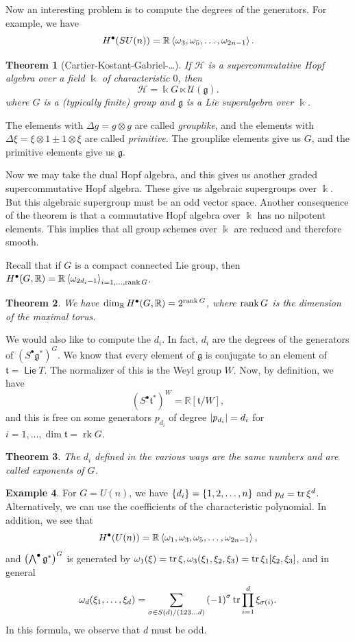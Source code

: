 \documentclass[leqno, openany]{memoir}
\newtheorem{thm}{Theorem}[section]
\theoremstyle{definition}
\newtheorem{exm}[thm]{Example}
\theoremstyle{remark}
\theoremstyle{plain}
\theoremstyle{definition}
\theoremstyle{remark}
\newcommand{\R}{\mathbb{R}}
\renewcommand{\k}{\Bbbk}
\newcommand{\mf}[1]{\mathfrak{#1}}
\DeclareMathOperator{\Lie}{\mathsf{Lie}}
\DeclareMathOperator{\rk}{rk}
\begin{document}
Now an interesting problem is to compute the degrees of the generators. For example, we have 
\[ H^{\bullet}(SU(n)) = \R \ev{\omega_3, \omega_5, \ldots, \omega_{2n-1}}. \]

\begin{thm}[Cartier-Kostant-Gabriel-\ldots]
    If $\mathcal{H}$ is a supercommutative Hopf algebra over a field $\k$ of characteristic $0$, then
    \[ \mathcal{H} = \k G \ltimes \mathcal{U}(\mf{g}). \]
    where $G$ is a (typically finite) group and $\mf{g}$ is a Lie superalgebra over $\k$.
\end{thm}

The elements with $\Delta g = g \otimes g$ are called \textit{grouplike}, and the elements with $\Delta \xi = \xi \otimes 1 \pm 1 \otimes \xi$ are called \textit{primitive}. The grouplike elements give us $G$, and the primitive elements give us $\mf{g}$. 

Now we may take the dual Hopf algebra, and this gives us another graded supercommutative Hopf algebra. These give us algebraic supergroups over $\k$. But this algebraic supergroup must be an odd vector space. Another consequence of the theorem is that a commutative Hopf algebra over $\k$ has no nilpotent elements. This implies that all group schemes over $\k$ are reduced and therefore smooth.

Recall that if $G$ is a compact connected Lie group, then $H^{\bullet}(G, \R) = \R \ev{\omega_{2d_i - 1}}_{i = 1, \ldots, \rank G}$.

\begin{thm}
    We have $\dim_{\R} H^{\bullet}(G, \R) = 2^{\rank G}$, where $\rank G$ is the dimension of the maximal torus.
\end{thm}

We would also like to compute the $d_i$. In fact, $d_i$ are the degrees of the generators of ${ ( S^{\bullet} \mf{g}^* ) }^G$. We know that every element of $\mf{g}$ is conjugate to an element of $\mf{t} = \Lie T$. The normalizer of this is the Weyl group $W$. Now, by definition, we have
\[ {(S^{\bullet} \mf{t}^*)}^W = \R[\mf{t}/W], \]
and this is free on some generators $p_{d_i}$ of degree $\abs{p_{d_i}} = d_i$ for $i = 1, \ldots, \dim \mf{t} = \rk G$.

\begin{thm}
    The $d_i$ defined in the various ways are the same numbers and are called \textit{exponents} of $G$.
\end{thm}

\begin{exm}
    For $G = U(n)$, we have $\qty{d_i} = \qty{1, 2, \ldots, n}$ and $p_d = \tr \xi^d$. Alternatively, we can use the coefficients of the characteristic polynomial. In addition, we see that
    \[ H^{\bullet}(U(n)) = \R \ev{\omega_1, \omega_3, \omega_5, \ldots, \omega_{2n-1}}, \]
    and ${\qty(\bigwedge^{\bullet} \mf{g}^*)}^G$ is generated by $\omega_1(\xi) = \tr \xi, \omega_3 (\xi_1, \xi_2, \xi_3) = \tr \xi_1 [\xi_2, \xi_3]$, and in general 
    \[ \omega_d(\xi_1, \ldots, \xi_d) = \sum_{\sigma \in S(d) / (123\ldots d)} {(-1)}^{\sigma} \tr \prod_{i=1}^d \xi_{\sigma(i)}. \]
    In this formula, we observe that $d$ must be odd.
\end{exm}
\end{document}
